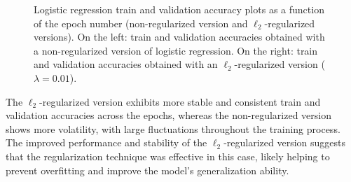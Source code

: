 \documentclass[a4paper, 12pt]{article}
\begin{document}
\begin{figure}[H]
\begin{subfigure}{0.47\textwidth}
        \label{fig:with_reg}
    \end{subfigure}
    \vspace{-0.6cm}
    \caption{Logistic regression train and validation accuracy plots as a function of the epoch number (non-regularized version and $\ell_2$-regularized versions). On the left: train and validation accuracies obtained with a non-regularized version of logistic regression. On the right: train and validation accuracies obtained with an $\ell_2$-regularized version ($\lambda=0.01$).}
    \label{fig:logistic_accuracy}
\end{figure}

The $\ell_2$-regularized version exhibits more stable and consistent train and validation accuracies across the epochs, whereas the non-regularized version shows more volatility, with large fluctuations throughout the training process. The improved performance and stability of the $\ell_2$-regularized version suggests that the regularization technique was effective in this case, likely helping to prevent overfitting and improve the model's generalization ability.
\end{document}
